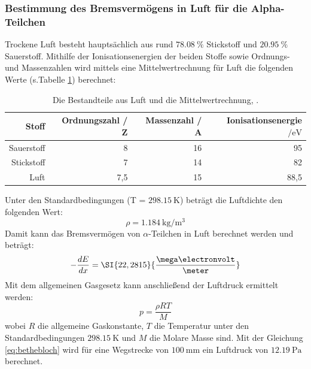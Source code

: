 \subsubsection{Bestimmung des Bremsvermögens in Luft für die Alpha-Teilchen}
Trockene Luft besteht hauptsächlich aus rund $\SI{78,08}{\percent}$ Stickstoff und $\SI{20,95}{\percent}$ Sauerstoff. Mithilfe der Ionisationsenergien der beiden Stoffe sowie Ordnungs- und Massenzahlen wird mittels eine Mittelwertrechnung für Luft die folgenden Werte 
(s.Tabelle \ref{tab:datenluft}) berechnet:

\begin{table}[htpb]
	\centering
	\caption{Die Bestandteile aus Luft und die Mittelwertrechnung, \cite{Sauerstoff} \cite{Stickstoff} \cite{Sauerstoff0} \cite{Stickstoff0}.}
	\label{tab:datenluft}
	\begin{tabular}{r|r|r|r}
		\toprule
		Stoff	&	Ordnungszahl / Z &	Massenzahl / A &  Ionisationsenergie $/ \si{\electronvolt}$\\
		\hline
		Sauerstoff & 	8 & 16 & 95 \\
		Stickstoff &	7 & 14 & 82 \\
		Luft & 	7,5 & 15 & 88,5 \\
		\bottomrule
	\end{tabular}
\end{table}

Unter den Standardbedingungen (T = $\SI{298,15}{\kelvin}$)\cite{Luftdichte} beträgt die Luftdichte den folgenden Wert:
\begin{equation}
\rho = \SI{1,184}{\kilogram\per\cubic\meter}
\end{equation}
Damit kann das Bremsvermögen von $\alpha$-Teilchen in Luft berechnet werden und beträgt:
\begin{equation*}
-\frac{dE}{dx} = \SI{22,2815}{\frac{\mega\electronvolt}{\meter}}
\end{equation*}
Mit dem allgemeinen Gasgesetz kann anschließend der Luftdruck ermittelt werden:
\begin{equation}
p = \frac{\rho R T}{M}
\end{equation}
wobei $R$ die allgemeine Gaskonstante, $T$ die Temperatur unter den Standardbedingungen $\SI{298,15}{\kelvin}$ und $M$ die Molare Masse sind. Mit der Gleichung \ref{eq:bethebloch} wird für eine Wegstrecke von $\SI{100}{\milli\meter}$ ein Luftdruck von $\SI{12,19}{\pascal}$ berechnet.